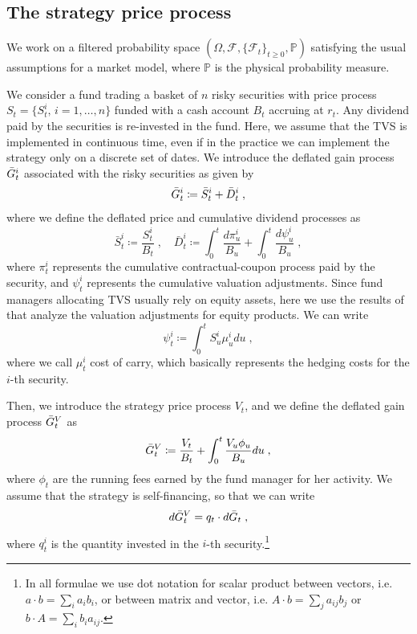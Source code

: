 \documentclass[runningheads]{m2ef}
\begin{document}
	\subsection{The strategy price process}
	We work on a filtered probability space $\left(\Omega, \mathcal{F}, \{\mathcal{F}_t\}_{t\geq0}, \mathbb{P}  \right)$ satisfying the usual assumptions for a market model, where $\mathbb{P}$ is the physical probability measure. 

	We consider a fund trading a basket of $n$ risky securities with price process $S_t = \{S_t^i, \, i=1,\dots,n\}$ funded with a cash account $B_t$ accruing at $r_t$. Any dividend paid by the securities is re-invested in the fund. Here, we assume that the TVS is implemented in continuous time, even if in the practice we can implement the strategy only on a discrete set of dates. We introduce the deflated gain process $\Bar{G}_t^i$ associated with the risky securities as given by
	\begin{equation}
		\Bar{G}_t^i \coloneqq \Bar{S}_t^i + \Bar{D}_t^i \; ,
	\end{equation}
	where we define the deflated price and cumulative dividend processes as 
	\begin{equation}
		\bar{S}_t^i \coloneqq \frac{S_t^i}{B_t} \; , \quad \bar{D}^i_t \coloneqq \int_0^t\frac{d\pi_u^i}{B_u} + \int_0^t\frac{d\psi_u^i}{B_u} \; ,
	\end{equation}
	where $\pi^i_t$ represents the cumulative contractual-coupon process paid by the security, and $\psi_t^i$ represents the cumulative valuation adjustments.
	Since fund managers allocating TVS usually rely on equity assets, here we use the results of \cite{Gabrielli2020} that analyze the valuation adjustments for equity products. We can write 
	\begin{equation}
		\psi_t^i \coloneqq \int_0^t S_u^i\mu_u^i du \; ,
	\label{eq:XVA_equity}\end{equation}
	where we call $\mu_t^i$ cost of carry, which basically represents the hedging costs for the $i$-th security.

	Then, we introduce the strategy price process $V_t$, and we define the deflated gain process $\Bar{G}_t^V$ as
	\begin{equation}
		\Bar{G}_t^V \coloneqq \frac{V_t}{B_t} + \int_0^t\frac{V_u\phi_u}{B_u}du \; ,
	\end{equation}
	where $\phi_t$ are the running fees earned by the fund manager for her activity. We assume that the strategy is self-financing, so that we can write
	\begin{equation}
		d\Bar{G}_t^V = q_t \cdot d\bar{G}_t \; ,
	\label{eq:self_financing}\end{equation}
	where $q_t^i$ is the quantity invested in the $i$-th security.\footnote{In all formulae we use dot notation for scalar product between vectors, i.e. $a \cdot b = \sum_i a_i b_i$, or between matrix and vector, i.e. $A \cdot b = \sum_j a_{ij}b_j$ or $b \cdot A = \sum_i b_i a_{ij}$.}
\end{document}
